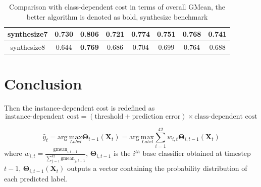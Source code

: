 \documentclass{article}
\begin{document}
\begin{table}[!ht]
\begin{tabular}{|c||c|c|ccccc|}
		synthesize7               & 0.730          & \textbf{0.806}                         & \multicolumn{1}{c|}{0.721}          & \multicolumn{1}{c|}{0.774} & \multicolumn{1}{c|}{0.751}          & \multicolumn{1}{c|}{0.768}          & 0.741          \\ \hline
		synthesize8               & 0.644            & \textbf{0.769}                        & \multicolumn{1}{c|}{0.686}          & \multicolumn{1}{c|}{0.704}          & \multicolumn{1}{c|}{0.699}          & \multicolumn{1}{c|}{0.764}          & 0.688          \\ \hline
	\end{tabular}
	\label{tab04:overall}
	\caption{Comparison with class-dependent cost in terms of overall GMean, the better algorithm is denoted as bold, synthesize benchmark}
\end{table}
\section{Conclusion}
Then the instance-dependent cost is redefined as 
\begin{equation}
	\text{instance-dependent cost}= (\text{threshold}+ \text{prediction error})\times \text{class-dependent cost}
\end{equation}

$$\hat{y}_t =\mathrm{arg\ }  \underset{Label}{\mathrm{max}} \mathbf{\Theta}_{t-1}(\mathbf{X}_t)=\mathrm{arg\ }  \underset{Label}{\mathrm{max}}  \sum_{i=1}^{42} w_{i,t} \mathbf{\Theta}_{i,t-1}(\mathbf{X}_t)$$
where $w_{i,t}=\frac{\text{gmean}_{i,t-1}}{\sum_{j=1}^{42}\text{gmean}_{j,t-1}}$, $\mathbf{\Theta}_{i,t-1}$ is the $i^{th}$ base classifier obtained at timestep $t-1$, $\mathbf{\Theta}_{i,t-1}(\mathbf{X}_t)$ outputs a vector containing the probability distribution of each predicted label.
\end{document}
